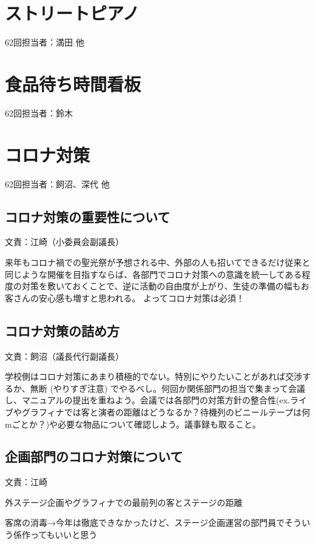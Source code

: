 \documentclass[a4paper]{ltjsreport}
\begin{document}
\section{ストリートピアノ}
62回担当者：満田 他

\section{食品待ち時間看板}\label{sec:食品待ち時間看板}
62回担当者：鈴木

\section{コロナ対策}
62回担当者：飼沼、深代 他

\subsection{コロナ対策の重要性について} 文責：江崎（小委員会副議長） \vspace{2mm}

来年もコロナ禍での聖光祭が予想される中、外部の人も招いてできるだけ従来と同じような開催を目指すならば、各部門でコロナ対策への意識を統一してある程度の対策を敷いておくことで、逆に活動の自由度が上がり、生徒の準備の幅もお客さんの安心感も増すと思われる。
よってコロナ対策は必須！

\subsection{コロナ対策の詰め方} 文責：飼沼（議長代行副議長） \vspace{2mm}

学校側はコロナ対策にあまり積極的でない。特別にやりたいことがあれば交渉するか、無断 (やりすぎ注意) でやるべし。何回か関係部門の担当で集まって会議し、マニュアルの提出を重ねよう。会議では各部門の対策方針の整合性(ex.ライブやグラフィナでは客と演者の距離はどうなるか？待機列のビニールテープは何mごとか？)や必要な物品について確認しよう。議事録も取ること。

\subsection{企画部門のコロナ対策について} 文責：江崎 \vspace{2mm}

外ステージ企画やグラフィナでの最前列の客とステージの距離

客席の消毒→今年は徹底できなかったけど、ステージ企画運営の部門員でそういう係作ってもいいと思う
\end{document}
